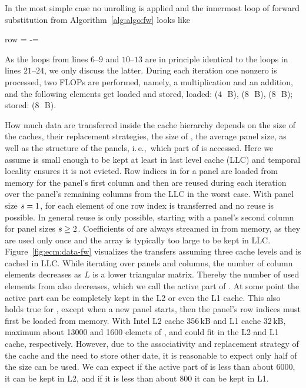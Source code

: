 In the most simple case no unrolling is applied and the innermost loop of
forward substitution from Algorithm~\ref{alg:algo:fw} looks like
%
\begin{algorithmic}[1]
  \setcounter{ALG@line}{20}
      \State row = \nindx[i++]
      \State \nr[row] -= \nr[j] \nlnz[k]
  \EndFor
\end{algorithmic}%
\noindent%
%
As the loops from lines $6$--$9$ and $10$--$13$ are in principle identical to
the loops in lines $21$--$24$, we only discuss the latter.
%
During each iteration one nonzero is processed, two FLOPs are performed,
namely, a multiplication and an addition, and the following elements get
loaded and stored, loaded: \vindx{} ($4$~\,B), \vr{} ($8$~\,B), \vlnz{}
($8$~\,B); stored: \vr{} ($8$~\,B).

How much data are transferred inside the cache hierarchy depends on the size of
the caches, their replacement strategies, the size of \vr{}, the average panel
size, as well as the structure of the panels, i.\,e.,\ which part of \vr{} is
accessed.
Here we assume \vr{} is small enough to be kept at least in last level cache
(LLC) and temporal locality ensures it is not evicted.
%
Row indices in \vindx{} for a panel are loaded from memory for the panel's first
column and then are reused during each iteration over the panel's remaining
columns from the LLC in the worst case.
With panel size $s=1$, for each element of \vlnz{} one row index is
transferred and no reuse is possible.
In general reuse is only possible, starting with a panel's second column for
panel sizes $s \ge 2$.
%
Coefficients of \vlnz{} are always streamed in from memory, as they are
used only once and the array \vlnz{} is typically too large to be kept in LLC.
Figure~\ref{fig:ecm:data-fw} visualizes the transfers assuming three cache levels
and \vr{} is cached in LLC.
While iterating over panels and columns, the number of column elements
decreases as $L$ is a lower triangular matrix.
Thereby the number of used elements from \vr{} also decreases, which we call the
active part of \vr{}.
At some point the active part can be completely kept in the L2 or even the L1 cache.
This also holds true for \vindx{}, except when a new panel starts, then
the panel's row indices must first be loaded from memory.
{\color{blue} With Intel L2 cache 356\,kB and L1 cache 32\,kB, maximum about 13000 and 1600 elemets of \vr{}, \vindx{} and \vlnz{} could fit in the L2 and L1 cache, respectively. However, due to the associativity and replacement strategy of the cache and the need to store other date, it is reasonable to expect only half of the size can be used. We can expect if the active part of \vr{} is less than about 6000, it can be kept in L2, and if it is less than about 800 it can be kept in L1.}


